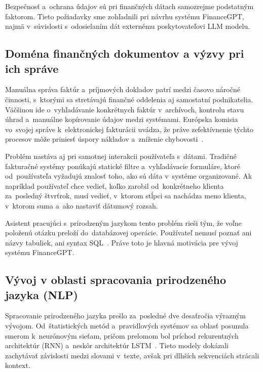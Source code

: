 
Bezpečnosť a~ochrana údajov sú pri finančných dátach samozrejme podstatným faktorom.
Tieto požiadavky sme zohľadnili pri návrhu systému FinanceGPT, najmä v~súvislosti
s~odosielaním dát externému poskytovateľovi LLM modelu.


\subsection{Doména finančných dokumentov a výzvy pri ich správe}

Manuálna správa faktúr a~príjmových dokladov patrí medzi časovo náročné činnosti,
s~ktorými sa stretávajú finančné oddelenia aj samostatní podnikatelia. Väčšinou ide
o~vyhľadávanie konkrétnych faktúr v~archívoch, kontrolu stavu úhrad a~manuálne
kopírovanie údajov medzi systémami. Európska komisia vo~svojej správe k~elektronickej
fakturácii uvádza, že práve zefektívnenie týchto procesov môže priniesť úspory
nákladov a~zníženie chybovosti~\cite{ec2020einvoicing}.

Problém nastáva aj pri samotnej interakcii používateľa s~dátami. Tradičné fakturačné
systémy ponúkajú statické filtre a~vyhľadávacie formuláre, ktoré od~používateľa
vyžadujú znalosť toho, ako sú dáta v~systéme organizované. Ak napríklad
používateľ chce vedieť, koľko zarobil od~konkrétneho klienta za~posledný štvrťrok,
musí vedieť, v~ktorom stĺpci sa nachádza meno klienta, v~ktorom suma a~ako
nastaviť dátumový rozsah.


Asistent pracujúci s~prirodzeným jazykom tento problém rieši tým, že voľne
položenú otázku preloží do~databázovej operácie. Používateľ nemusí poznať ani názvy
tabuliek, ani syntax SQL~\cite{zhao2023}. Práve toto je hlavná motivácia pre vývoj
systému FinanceGPT.

\subsection{Vývoj v oblasti spracovania prirodzeného jazyka (NLP)}

Spracovanie prirodzeného jazyka prešlo za~posledné dve desaťročia výrazným
vývojom. Od~štatistických metód a~pravidlových systémov sa oblasť posunula smerom
k~neurónovým sieťam, pričom prelomom bol príchod rekurentných architektúr (RNN)
a~neskôr architektúr LSTM~\cite{lipton2015}. Tieto modely dokázali zachytávať závislosti
medzi slovami v~texte, avšak pri dlhších sekvenciách strácali kontext.


